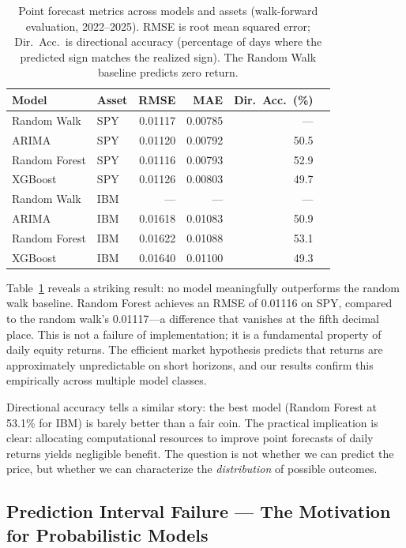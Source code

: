 \documentclass[11pt,a4paper]{article}
\begin{document}
\begin{table}[H]
\centering
\caption{Point forecast metrics across models and assets (walk-forward evaluation, 2022--2025). RMSE is root mean squared error; Dir.\ Acc.\ is directional accuracy (percentage of days where the predicted sign matches the realized sign). The Random Walk baseline predicts zero return.}
\label{tab:rmse}
\small
\begin{tabular}{@{}llrrrr@{}}
\toprule
\textbf{Model} & \textbf{Asset} & \textbf{RMSE} & \textbf{MAE} & \textbf{Dir.\ Acc.\ (\%)} \\
\midrule
Random Walk   & SPY & 0.01117 & 0.00785 & ---   \\
ARIMA         & SPY & 0.01120 & 0.00792 & 50.5  \\
Random Forest & SPY & 0.01116 & 0.00793 & 52.9  \\
XGBoost       & SPY & 0.01126 & 0.00803 & 49.7  \\
\midrule
Random Walk   & IBM & ---     & ---     & ---   \\
ARIMA         & IBM & 0.01618 & 0.01083 & 50.9  \\
Random Forest & IBM & 0.01622 & 0.01088 & 53.1  \\
XGBoost       & IBM & 0.01640 & 0.01100 & 49.3  \\
\bottomrule
\end{tabular}
\end{table}

Table~\ref{tab:rmse} reveals a striking result: no model meaningfully outperforms the random walk baseline.
Random Forest achieves an RMSE of 0.01116 on SPY, compared to the random walk's 0.01117---a difference that vanishes at the fifth decimal place.
This is not a failure of implementation; it is a fundamental property of daily equity returns.
The efficient market hypothesis \citep{fama1970} predicts that returns are approximately unpredictable on short horizons, and our results confirm this empirically across multiple model classes.

Directional accuracy tells a similar story: the best model (Random Forest at 53.1\% for IBM) is barely better than a fair coin.
The practical implication is clear: allocating computational resources to improve point forecasts of daily returns yields negligible benefit.
The question is not whether we can predict the price, but whether we can characterize the \emph{distribution} of possible outcomes.

\subsection{Prediction Interval Failure --- The Motivation for Probabilistic Models}
\label{sec:pi_failure}
\end{document}
